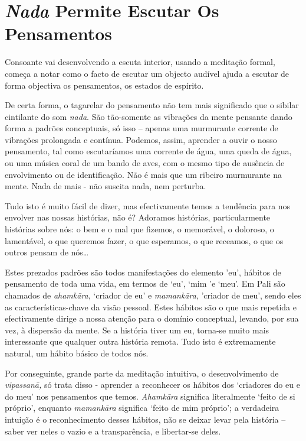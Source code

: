 \chapter{\emph{Nada} Permite Escutar Os Pensamentos}

Consoante vai desenvolvendo a escuta interior, usando a meditação
formal, começa a notar como o facto de escutar um objecto audível ajuda
a escutar de forma objectiva os pensamentos, os estados de espírito.

De certa forma, o tagarelar do pensamento não tem mais significado que o
sibilar cintilante do som \emph{nada}. São tão-somente as vibrações da
mente pensante dando forma a padrões conceptuais, só isso -- apenas uma
murmurante corrente de vibrações prolongada e contínua. Podemos, assim,
aprender a ouvir o nosso pensamento, tal como escutaríamos uma corrente
de água, uma queda de água, ou uma música coral de um bando de aves, com
o mesmo tipo de ausência de envolvimento ou de identificação. Não é mais
que um ribeiro murmurante na mente. Nada de mais - não suscita nada, nem
perturba.

Tudo isto é muito fácil de dizer, mas efectivamente temos a tendência
para nos envolver nas nossas histórias, não é? Adoramos histórias,
particularmente histórias sobre nós: o bem e o mal que fizemos, o
memorável, o doloroso, o lamentável, o que queremos fazer, o que
esperamos, o que receamos, o que os outros pensam de nós\ldots{}

Estes prezados padrões são todos manifestações do elemento 'eu', hábitos
de pensamento de toda uma vida, em termos de `eu', `mim 'e `meu'. Em
Pali são chamados de \emph{ahamkāra}, `criador de eu' e
\emph{mamankāra}, 'criador de meu', sendo eles as características-chave
da visão pessoal. Estes hábitos são o que mais repetida e efectivamente
dirige a nossa atenção para o domínio conceptual, levando, por sua vez,
à dispersão da mente. Se a história tiver um eu, torna-se muito mais
interessante que qualquer outra história remota. Tudo isto é
extremamente natural, um hábito básico de todos nós.

Por conseguinte, grande parte da meditação intuitiva, o desenvolvimento
de \emph{vipassanā,} só trata disso - aprender a reconhecer os hábitos
dos `criadores do eu e do meu' nos pensamentos que temos.
\emph{Ahamkāra} significa literalmente `feito de si próprio', enquanto
\emph{mamankāra} significa `feito de mim próprio'; a verdadeira intuição
é o reconhecimento desses hábitos, não se deixar levar pela história --
saber ver neles o vazio e a transparência, e libertar-se deles.

